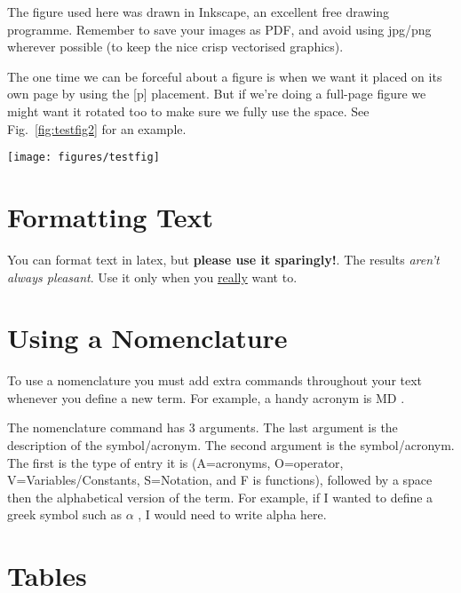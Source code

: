 \documentclass[12pt, BEng]{UoAThesis}
\begin{document}
The figure used here was drawn in Inkscape, an excellent free drawing
programme. Remember to save your images as PDF, and avoid using
jpg/png wherever possible (to keep the nice crisp vectorised graphics).

The one time we can be forceful about a figure is when we want it
placed on its own page by using the [p] placement. But if we're
doing a full-page figure we might want it rotated too to make sure we
fully use the space. See Fig.~\ref{fig:testfig2} for an example.
\begin{sidewaysfigure}
  \centering
  \texttt{[image: figures/testfig]}
  \caption{\label{fig:testfig2} A full page test figure and even the caption is rotated!.}
\end{sidewaysfigure}

\section{Formatting Text}
You can format text in latex, but {\bf please use it sparingly!}. The
results {\em aren't always pleasant}. Use it only when you
\underline{really} want to.

\section{Using a Nomenclature}
To use a nomenclature you must add extra commands throughout your text
whenever you define a new term. For example, a handy acronym is MD
. 

The nomenclature command has 3 arguments. The last argument is the
description of the symbol/acronym. The second argument is the
symbol/acronym. The first is the type of entry it is (A=acronyms,
O=operator, V=Variables/Constants, S=Notation, and F is functions),
followed by a space then the alphabetical version of the term. For
example, if I wanted to define a greek symbol such as $\alpha$
, I would need to write alpha
here.

\section{Tables}
\end{document}
